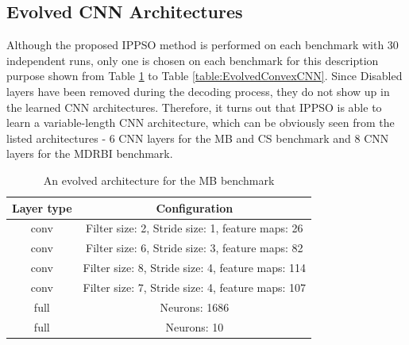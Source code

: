 \documentclass[conference]{IEEEtran}
\begin{document}
\subsection{Evolved CNN Architectures}\label{sec:EvolvedCNN}

Although the proposed IPPSO method is performed on each benchmark with 30 independent runs, only one is chosen on each benchmark for this description purpose shown from Table \ref{table:EvolvedMBCNN} to Table \ref{table:EvolvedConvexCNN}. Since Disabled layers have been removed during the decoding process, they do not show up in the learned CNN architectures. Therefore, it turns out that IPPSO is able to learn a variable-length CNN architecture, which can be obviously seen from the listed architectures - 6 CNN layers for the MB and CS benchmark and 8 CNN layers for the MDRBI benchmark. 

\begin{table}[!t]
	\renewcommand{\arraystretch}{1.3}
	\caption{An evolved architecture for the MB benchmark}
	\label{table:EvolvedMBCNN}
	\centering
	\begin{tabular}{|c|c|}
		\hline
		Layer type & Configuration\\
		\hline
		conv & Filter size: 2, Stride size: 1, feature maps: 26\\
		\hline
		conv & Filter size: 6, Stride size: 3, feature maps: 82\\
		\hline
		conv & Filter size: 8, Stride size: 4, feature maps: 114\\
		\hline
		conv & Filter size: 7, Stride size: 4, feature maps: 107\\
		\hline
		full & Neurons: 1686\\
		\hline
		full & Neurons: 10\\
		\hline
	\end{tabular}
\end{table}
\end{document}
